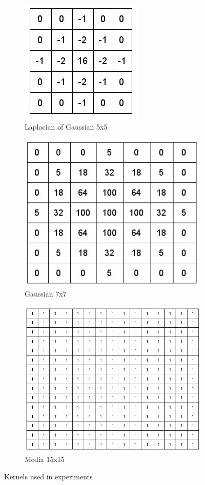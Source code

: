 \begin{figure}[h!]
\begin{subfigure}{0.3\textwidth}
  \centering
  \includegraphics[width=0.5\linewidth]{figs/laplacian-of-gaussian.png}
  \caption{Laplacian of Gaussian 5x5}
\end{subfigure}
\begin{subfigure}{0.3\textwidth}
  \centering
  \includegraphics[width=0.9\linewidth]{figs/gaussian.png}
  \caption{Gaussian 7x7}
\end{subfigure}%
\begin{subfigure}{0.7\textwidth}
  \centering
  \includegraphics[width=0.9\linewidth]{figs/media.png}
  \caption{Media 15x15}
\end{subfigure}
 \caption{Kernels used in experiments}
\label{fig:conv-kernels}
\end{figure}

